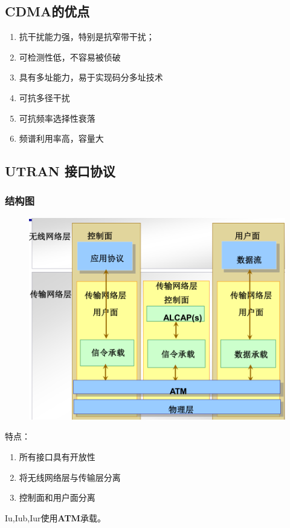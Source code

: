 \subsection{CDMA的优点}
\begin{enumerate}
	\item 抗干扰能力强，特别是抗窄带干扰；
	\item 可检测性低，不容易被侦破
	\item 具有多址能力，易于实现码分多址技术
	\item 可抗多径干扰
	\item 可抗频率选择性衰落
	\item 频谱利用率高，容量大
\end{enumerate}
\subsection{UTRAN 接口协议}
\subsubsection{结构图}
\begin{figure}[H]
	\centering
	\includegraphics[width=0.7\linewidth]{figures/screenshot014}
	\caption{}
	\label{fig:screenshot014}
\end{figure}
特点：
\begin{enumerate}
	\item 所有接口具有开放性
	\item 将无线网络层与传输层分离
	\item 控制面和用户面分离
\end{enumerate}
Iu,Iub,Iur使用\textbf{ATM}承载。
